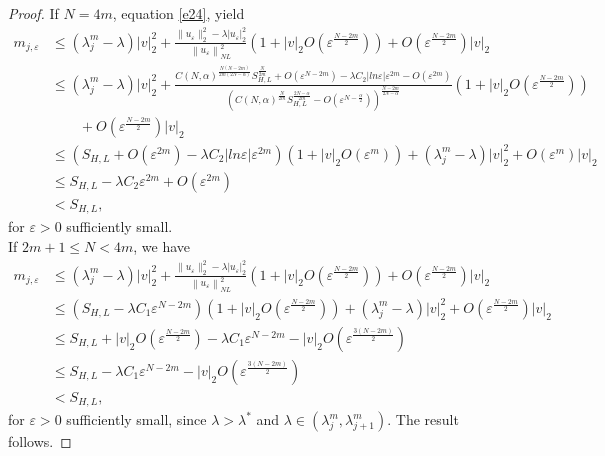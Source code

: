 \documentclass[reqno]{amsart}
\newcommand{\la} {\lambda}
\newcommand{\eps}{\varepsilon}
\newcommand{\al} {\alpha}
\newcommand{\noi} {  \noindent}
\numberwithin{theorem}{section} \numberwithin{equation}{section}
\begin{document}
\begin{proof}
\noi If $N=4m$, equation \eqref{e24}, yield
\begin{align*}
m_{j,\eps} & \leq\left(\la^m_j-\la\right)|v|_2^2+\frac{\|u_{\eps}\|_2^2-\la\left|u_{\eps}\right|_2^2}{\left\|u_{\eps}\right\|_{N L}^2}\left(1+|v|_2 O\left(\eps^{\frac{N-2m}{2}}\right)\right)+O\left(\eps^{\frac{N-2m}{2}}\right)|v|_2 \\
& \leq\left(\la^m_j-\la\right)|v|_2^2+\frac{C(N, \al)^{\frac{N(N-2m)}{2m(2N-\al)}} S_{H, L}^{\frac{N}{2m}}+O\left(\eps^{N-2m}\right)-\la C_2 |ln{\eps}| \eps^{2m} -O\left(\eps^{2m}\right)}{\left(C(N, \al)^{\frac{N}{2m}} S_{H, L}^{\frac{2N-\al}{2m}}-O\left(\eps^{N-\frac{\al}{2}}\right)\right)^{\frac{N-2m}{2N-\al}}}\left(1+|v|_2 O\left(\eps^{\frac{N-2m}{2}}\right)\right)\\& \qquad+O\left(\eps^{\frac{N-2m}{2}}\right)|v|_2 \\
&\leq\left(S_{H, L} +O\left(\eps^{2m}\right) -\la C_2 |ln{\eps}| \eps^{2m}\right)\left(1+|v|_2 O\left(\eps^{m}\right)\right)+\left(\la^m_j-\la\right)|v|_2^2+O\left(\eps^{m}\right)|v|_2 \\
&\leq S_{H, L}-\la C_2 \eps^{2m}+ O\left(\eps^{2m}\right) \\
&<S_{H, L},
\end{align*}
for $\eps>0$ sufficiently small.\\

\noi If $2m+1\leq N< 4m$, we have
\begin{align*}
m_{j,\eps} & \leq\left(\la^m_j-\la\right)|v|_2^2+\frac{\|u_{\eps}\|_2^2-\la\left|u_{\eps}\right|_2^2}{\left\|u_{\eps}\right\|_{NL}^2}\left(1+|v|_2 O\left(\eps^{\frac{N-2m}{2}}\right)\right)+O\left(\eps^{\frac{N-2m}{2}}\right)|v|_2 \\
& \leq\left(S_{H, L}-\la C_1\eps^{N-2m} \right)\left(1+|v|_2 O\left(\eps^{\frac{N-2m}{2}}\right)\right)+\left(\la^m_j-\la\right)|v|_2^2+O\left(\eps^{\frac{N-2m}{2}}\right)|v|_2 \\
& \leq S_{H, L}+|v|_2 O\left(\eps^{\frac{N-2m}{2}}\right)-\la C_1\eps^{N-2m}-|v|_2 O\left(\eps^{\frac{3(N-2m)}{2}}\right)\\
&\leq S_{H, L}-\la C_1\eps^{N-2m}-|v|_2 O\left(\eps^{\frac{3(N-2m)}{2}}\right)\\
& <S_{H, L} ,
\end{align*}
for $\eps>0$ sufficiently small, since $\la>\la^*$ and $\la \in\left(\la^m_j, \la^m_{j+1}\right)$. The result follows.   
\end{proof}
\noi {\bf{Proof of Theorem (\ref{t4})}}\\
\end{document}

